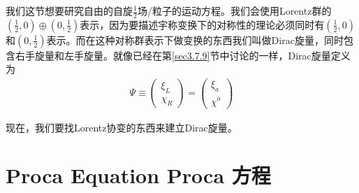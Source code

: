 我们这节想要研究自由的自旋$\frac{1}{2}$场/粒子的运动方程。我们会使用Lorentz群的$(\frac{1}{2},0)\oplus(0,\frac{1}{2})$表示，因为要描述宇称变换下的对称性的理论必须同时有$(\frac{1}{2},0)$和$(0,\frac{1}{2})$表示。而在这种对称群表示下做变换的东西我们叫做Dirac旋量，同时包含右手旋量和左手旋量。就像已经在第\ref{sec3.7.9}节中讨论的一样，Dirac旋量定义为
\begin{align}
\Psi\equiv\left(\begin{matrix}\xi_L\\ \chi_R\end{matrix}\right)=\left(\begin{matrix}\xi_a\\ \chi^{\dot{a}}\end{matrix}\right)
\end{align}

现在，我们要找Lorentz协变的东西来建立Dirac旋量。


\section[Proca方程]{Proca Equation Proca 方程}\label{sec6.4}







